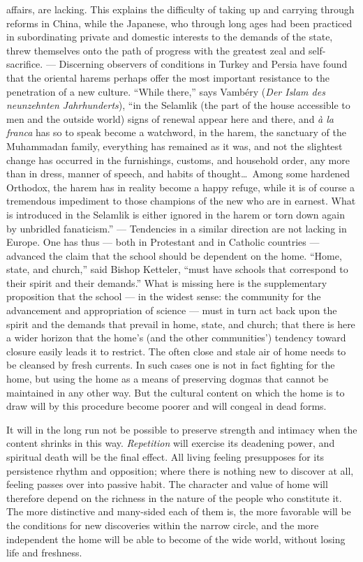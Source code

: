 \documentclass[12pt,a4paper]{article}
\newcommand{\opage}[1]{\marginnote{\footnotesize\textit{[#1]}}}
\begin{document}
affairs, are lacking. This explains the difficulty of taking up and
carrying through reforms in China, while the Japanese, who through
long ages had been practiced in subordinating private and domestic
interests to the demands of the state, threw themselves onto the path
of progress with the greatest zeal and self-sacrifice. --- Discerning
observers of conditions in Turkey and Persia have found that the
oriental harems perhaps offer the most important resistance to the
penetration of a new \opage{9}culture. ``While there,'' says Vambéry
(\emph{Der Islam des neunzehnten Jahrhunderts}), ``in the Selamlik
(the part of the house accessible to men and the outside world) signs
of renewal appear here and there, and \emph{\`{a} la franca} has so
to speak become a watchword, in the harem, the sanctuary of the
Muhammadan family, everything has remained as it was, and not the
slightest change has occurred in the furnishings, customs, and
household order, any more than in dress, manner of speech, and
habits of thought\ldots\ Among some hardened Orthodox, the harem
has in reality become a happy refuge, while it is of course a
tremendous impediment to those champions of the new who are in
earnest. What is introduced in the Selamlik is either ignored in the
harem or torn down again by unbridled fanaticism.'' --- Tendencies in
a similar direction are not lacking in Europe. One has thus ---
both in Protestant and in Catholic countries --- advanced the claim
that the school should be dependent on the home. ``Home, state, and
church,'' said Bishop Ketteler, ``must have schools that correspond to
their spirit and their demands.'' What is missing here is the
supplementary proposition that the school --- in the widest sense:
the community for the advancement and appropriation of science ---
must in turn act back upon the spirit and the demands that prevail in
home, state, and church; that there is here a wider horizon that the home's
(and the other communities') tendency toward closure easily leads it
to restrict. The often close and stale air of home needs to be
cleansed by fresh currents. In such cases one is not in fact fighting
for the home, but using the home as a means of preserving dogmas
that cannot be maintained in any other way. But the cultural content
on which the home is to draw will by this procedure become poorer
and will congeal in dead forms.

It will in the long run not be possible to preserve strength and
intimacy when the content shrinks in this way. \emph{Repetition} will
exercise its deadening power, and spiritual death will be the final
effect. All living feeling presupposes for its persistence rhythm and
opposition; where there is nothing new to discover at all, feeling
passes over into passive habit. The character and value of home will
therefore depend on the richness in the nature of the people who
constitute it. The more distinctive and many-sided each of them is,
the more favorable will be the conditions for new discoveries within
the narrow circle, and the more independent the home will be able to
become of the wide world, without losing life and freshness.
\end{document}
